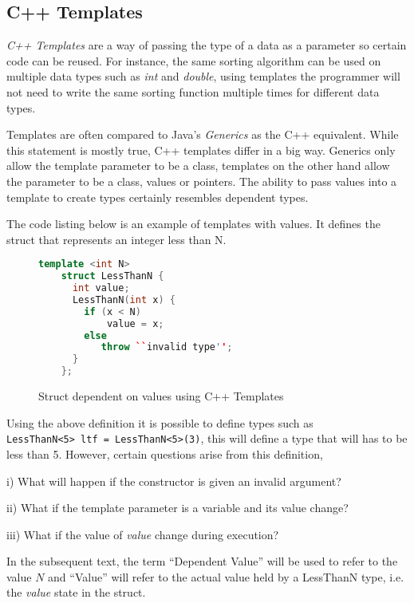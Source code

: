 \documentclass[a4paper,12pt]{report}
\begin{document}
\subsection{C++ Templates}
\textit{C++ Templates} \cite{cppTemplate} are a way of passing the type of a 
data as a parameter so certain code can be reused. For instance, the same 
sorting algorithm can be used on multiple data types such as \textit{int} and 
\textit{double}, using templates the programmer will not need to write the same 
sorting function multiple times for different data types. 

\par
Templates are often compared to Java's \textit{Generics} \cite{javaGenerics} 
as the C++ equivalent. While this statement is mostly true, C++ templates 
differ in a big way. 
Generics only allow the template parameter to be a class, templates on the other 
hand allow the parameter to be a class, values or pointers. The ability to 
pass values into a template to create types certainly resembles dependent types.

\par
The code listing below is an example of templates with values. It defines the 
struct that represents an integer less than N. 

\begin{figure}[H]
  \begin{lstlisting}[language=c++]     
    template <int N>
    struct LessThanN {
      int value;
      LessThanN(int x) {
        if (x < N)
            value = x;
        else
           throw ``invalid type'';
      }
    };
  \end{lstlisting}
  \caption{Struct dependent on values using C++ Templates}
\end{figure}

\par
Using the above definition it is possible to define types such as \\
\verb+LessThanN<5> ltf = LessThanN<5>(3)+, this will define a type that will has 
to be less than 5. However, certain questions arise from this definition, 

i) What will happen if the constructor is given an invalid argument? 

ii) What if the template parameter is a variable and its 
value change? 

iii) What if the value of \textit{value} change during execution?

In the subsequent text, the term ``Dependent Value'' will be used to refer to the 
value $N$ and ``Value'' will refer to the actual value held by a LessThanN type, 
i.e. the \textit{value} state in the struct. 
\end{document}
